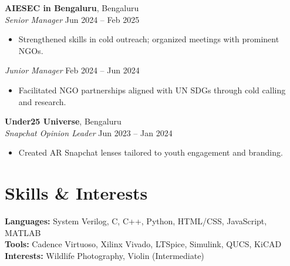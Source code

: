 \documentclass[a4paper,10pt]{article}
\begin{document}
\textbf{AIESEC in Bengaluru}, Bengaluru \\
\textit{Senior Manager} \hfill Jun 2024 -- Feb 2025 \\
\begin{itemize}[leftmargin=*]
    \item Strengthened skills in cold outreach; organized meetings with prominent NGOs.
\end{itemize}
\textit{Junior Manager} \hfill Feb 2024 -- Jun 2024 \\
\begin{itemize}[leftmargin=*]
    \item Facilitated NGO partnerships aligned with UN SDGs through cold calling and research.
\end{itemize}

\textbf{Under25 Universe}, Bengaluru \\
\textit{Snapchat Opinion Leader} \hfill Jun 2023 -- Jan 2024 \\
\begin{itemize}[leftmargin=*]
    \item Created AR Snapchat lenses tailored to youth engagement and branding.
\end{itemize}

\section*{Skills \& Interests}
\textbf{Languages:} System Verilog, C, C++, Python, HTML/CSS, JavaScript, MATLAB \\
\textbf{Tools:} Cadence Virtuoso, Xilinx Vivado, LTSpice, Simulink, QUCS, KiCAD \\
\textbf{Interests:} Wildlife Photography, Violin (Intermediate)
\end{document}
